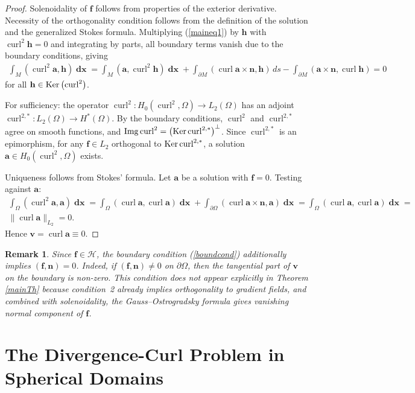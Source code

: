 \documentclass[a4paper]{article}
\newcommand{\Ker}{{\rm Ker}}
\newcommand{\Img}{{\rm Img}}
\newcommand{\bh}{\mathbf{h}}
\newcommand{\bff}{\mathbf{f}}
\newcommand{\dx}{\operatorname{\mathbf{dx}}}
\newcommand{\ba}{\mathbf{a}}
\newcommand{\curl}{\operatorname{curl}}
\newcommand{\bv}{\mathbf{v}}
\newcommand{\bn}{\mathbf{n}}
\newtheorem{remark*}{Remark}[]
\begin{document}
\begin{proof}
Solenoidality of $\bff$ follows from properties of the exterior derivative. Necessity of the orthogonality condition follows from the definition of the solution and the generalized Stokes formula. Multiplying (\ref{maineq1}) by $\bh$ with $\curl^2 \bh =0$ and integrating by parts, all boundary terms vanish due to the boundary conditions, giving
\begin{align*}
\int_M (\curl^2 \ba, \bh) \dx = 
\int_M (\ba, \curl^2 \bh) \dx +
\int_{\partial M} (\curl \ba \times \bn, \bh)\,ds - 
\int_{\partial M} (\ba \times \bn, \curl \bh) = 0
\end{align*}
for all $\bh \in \Ker \left ( \curl^2 \right )$.

For sufficiency: the operator $\curl^2: H_0(\curl^2,\Omega)\to L_2(\Omega)$ has an adjoint $\curl^{2,*}: L_2(\Omega) \to H^*(\Omega)$. By the boundary conditions, $\curl^2$ and $\curl^{2,*}$ agree on smooth functions, and $\Img \curl^2 = \left ( \Ker \curl^{2,*} \right )^\perp$. Since $\curl^{2,*}$ is an epimorphism, for any $\bff \in L_2$ orthogonal to $\Ker \curl^{2,*}$, a solution $\ba \in H_0(\curl^2,\Omega)$ exists.

Uniqueness follows from Stokes' formula. Let $\ba$ be a solution with $\bff=0$. Testing against $\ba$:
\begin{align*}
\int_\Omega (\curl^2 \ba,\ba) \dx= 
\int_\Omega (\curl \ba, \curl \ba) \dx + 
\int_{\partial \Omega} (\curl \ba \times \bn, \ba) \dx =
\int_\Omega (\curl \ba, \curl \ba) \dx = \\ \|\curl \ba\|_{L_2} = 0.
\end{align*}
Hence $\bv = \curl \ba \equiv 0$.  
\end{proof}

\begin{remark*}
Since $\bff \in \mathcal H$, the boundary condition (\ref{boundcond}) additionally implies $(\bff,\bn)=0$. Indeed, if $(\bff,\bn) \neq 0$ on $\partial \Omega$, then the tangential part of $\bv$ on the boundary is non-zero. This condition does not appear explicitly in Theorem \ref{mainTh} because condition~2 already implies orthogonality to gradient fields, and combined with solenoidality, the Gauss--Ostrogradsky formula gives vanishing normal component of $\bff$.
\end{remark*}

\section{The Divergence-Curl Problem in \\Spherical Domains}
\end{document}
